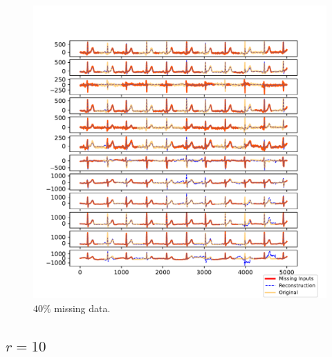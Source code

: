 \documentclass{mldsmsc}
\begin{document}
\begin{figure}[H]
\vspace{1em} %

\begin{minipage}{0.4\linewidth}
    \centering
    \includegraphics[width=\linewidth]{images/missing/psmf_output_40_3.pdf}
    \caption{$40\%$ missing data.}
\end{minipage}
\end{figure}

\subsection{$r = 10$}
\end{document}
